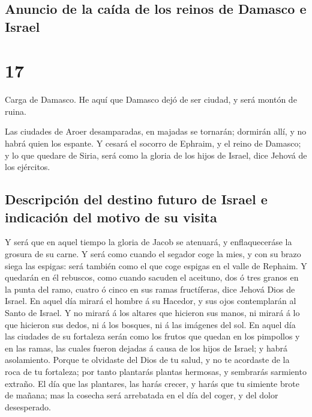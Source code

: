 \hypertarget{anuncio-de-la-cauxedda-de-los-reinos-de-damasco-e-israel}{%
\subsection{Anuncio de la caída de los reinos de Damasco e
Israel}\label{anuncio-de-la-cauxedda-de-los-reinos-de-damasco-e-israel}}

\hypertarget{section-16}{%
\section{17}\label{section-16}}

 Carga de Damasco. He aquí que Damasco dejó de ser ciudad,
y será montón de ruina.

 Las ciudades de Aroer desamparadas, en majadas se
tornarán; dormirán allí, y no habrá quien los espante.  Y
cesará el socorro de Ephraim, y el reino de Damasco; y lo que quedare de
Siria, será como la gloria de los hijos de Israel, dice Jehová de los
ejércitos.

\hypertarget{descripciuxf3n-del-destino-futuro-de-israel-e-indicaciuxf3n-del-motivo-de-su-visita}{%
\subsection{Descripción del destino futuro de Israel e indicación del
motivo de su
visita}\label{descripciuxf3n-del-destino-futuro-de-israel-e-indicaciuxf3n-del-motivo-de-su-visita}}

 Y será que en aquel tiempo la gloria de Jacob se
atenuará, y enflaqueceráse la grosura de su carne.  Y será
como cuando el segador coge la mies, y con su brazo siega las espigas:
será también como el que coge espigas en el valle de Rephaim.
 Y quedarán en él rebuscos, como cuando sacuden el
aceituno, dos ó tres granos en la punta del ramo, cuatro ó cinco en sus
ramas fructíferas, dice Jehová Dios de Israel.  En aquel
día mirará el hombre á su Hacedor, y sus ojos contemplarán al Santo de
Israel.  Y no mirará á los altares que hicieron sus manos,
ni mirará á lo que hicieron sus dedos, ni á los bosques, ni á las
imágenes del sol.  En aquel día las ciudades de su
fortaleza serán como los frutos que quedan en los pimpollos y en las
ramas, las cuales fueron dejadas á causa de los hijos de Israel; y habrá
asolamiento.  Porque te olvidaste del Dios de tu salud, y
no te acordaste de la roca de tu fortaleza; por tanto plantarás plantas
hermosas, y sembrarás sarmiento extraño.  El día que las
plantares, las harás crecer, y harás que tu simiente brote de mañana;
mas la cosecha será arrebatada en el día del coger, y del dolor
desesperado.

